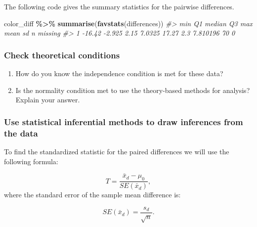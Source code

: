 \documentclass[
]{report}
\newenvironment{Shaded}{\begin{snugshade}}{\end{snugshade}}
\newcommand{\CommentTok}[1]{\textcolor[rgb]{0.56,0.35,0.01}{\textit{#1}}}
\newcommand{\FunctionTok}[1]{\textcolor[rgb]{0.13,0.29,0.53}{\textbf{#1}}}
\newcommand{\NormalTok}[1]{#1}
\newcommand{\SpecialCharTok}[1]{\textcolor[rgb]{0.81,0.36,0.00}{\textbf{#1}}}
\begin{document}
The following code gives the summary statistics for the pairwise differences.

\begin{Shaded}
\begin{Highlighting}[]
\NormalTok{color\_diff }\SpecialCharTok{\%\textgreater{}\%} 
  \FunctionTok{summarise}\NormalTok{(}\FunctionTok{favstats}\NormalTok{(differences))}
\CommentTok{\#\textgreater{}      min     Q1 median     Q3   max mean       sd  n missing}
\CommentTok{\#\textgreater{} 1 {-}16.42 {-}2.925   2.15 7.0325 17.27  2.3 7.810196 70       0}
\end{Highlighting}
\end{Shaded}

\hypertarget{check-theoretical-conditions}{%
\subsubsection*{Check theoretical conditions}\label{check-theoretical-conditions}}

\begin{enumerate}
\def\labelenumi{\arabic{enumi}.}
\setcounter{enumi}{3}
\item
  How do you know the independence condition is met for these data?
  \vspace{0.8in}
\item
  Is the normality condition met to use the theory-based methods for analysis? Explain your answer.
  \vspace{1in}
\end{enumerate}

\hypertarget{use-statistical-inferential-methods-to-draw-inferences-from-the-data}{%
\subsubsection*{Use statistical inferential methods to draw inferences from the data}\label{use-statistical-inferential-methods-to-draw-inferences-from-the-data}}

To find the standardized statistic for the paired differences we will use the following formula:

\[T = \frac{\bar{x}_d - \mu_0}{SE(\bar{x}_d)},\]
where the standard error of the sample mean difference is:

\[SE(\bar{x}_d)=\frac{s_d}{\sqrt{n}}.\]
\end{document}
